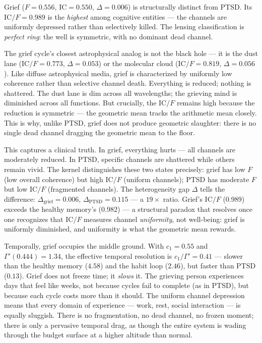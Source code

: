 \documentclass[
  aps,
  prd,
  twocolumn,
  superscriptaddress,
  nofootinbib,
  floatfix
]{revtex4-2}
\newcommand{\Gam}{\Gamma}
\newcommand{\IC}{\mathrm{IC}}
\begin{document}
Grief ($F = 0.556$, $\IC = 0.550$, $\Delta = 0.006$) is
structurally distinct from PTSD.  Its $\IC/F = 0.989$ is
the \emph{highest} among cognitive entities --- the channels
are uniformly depressed rather than selectively killed.
The lensing classification is \emph{perfect ring}: the well
is symmetric, with no dominant dead channel.

The grief cycle's closest astrophysical analog is not
the black hole --- it is the dust lane ($\IC/F = 0.773$,
$\Delta = 0.053$) or the molecular cloud ($\IC/F = 0.819$,
$\Delta = 0.056$).  Like diffuse astrophysical media, grief
is characterized by uniformly low coherence rather than
selective channel death.  Everything is reduced;
nothing is shattered.  The dust lane is dim across all
wavelengths; the grieving mind is diminished across all functions.
But crucially, the $\IC/F$ remains high because the
reduction is symmetric --- the geometric mean tracks the
arithmetic mean closely.  This is why, unlike PTSD, grief
does not produce geometric slaughter: there is no single
dead channel dragging the geometric mean to the floor.

This captures a clinical truth.  In grief, everything hurts
--- all channels are moderately reduced.  In PTSD, specific
channels are shattered while others remain vivid.  The kernel
distinguishes these two states precisely: grief has low $F$
(low overall coherence) but high $\IC/F$ (uniform channels);
PTSD has moderate $F$ but low $\IC/F$ (fragmented channels).
The heterogeneity gap $\Delta$ tells the difference:
$\Delta_{\text{grief}} = 0.006$,
$\Delta_{\text{PTSD}} = 0.115$ --- a $19\times$ ratio.
Grief's $\IC/F$ (0.989) exceeds the healthy memory's (0.982)
--- a structural paradox that resolves once one recognizes
that $\IC/F$ measures channel \emph{uniformity}, not
well-being: grief is uniformly diminished, and uniformity
is what the geometric mean rewards.

Temporally, grief occupies the middle ground.  With $c_1 =
0.55$ and $\Gam'(0.444) = 1.34$, the effective temporal
resolution is $c_1/\Gam' = 0.41$ --- slower than the healthy
memory ($4.58$) and the habit loop ($2.46$), but faster than
PTSD ($0.13$).  Grief does not freeze time; it \emph{slows}
it.  The grieving person experiences days that feel like
weeks, not because cycles fail to complete (as in PTSD), but
because each cycle costs more than it should.  The uniform
channel depression means that every domain of experience ---
work, rest, social interaction --- is equally sluggish.
There is no fragmentation, no dead channel, no frozen moment;
there is only a pervasive temporal drag, as though the entire
system is wading through the budget surface at a higher
altitude than normal.
\end{document}
